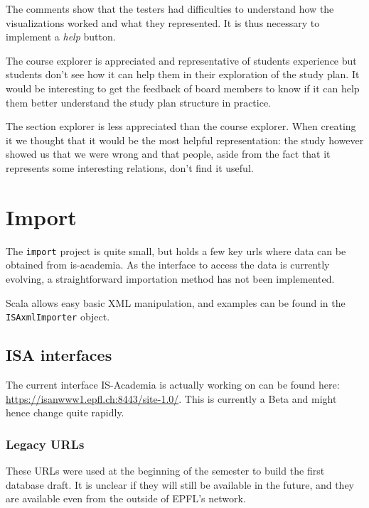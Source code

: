 The comments show that the testers had difficulties to understand how the visualizations worked and what they represented. It is thus necessary to implement a \emph{help} button. 

The course explorer is appreciated and representative of students experience but students don't see how it can help them in their exploration of the study plan. It would be interesting to get the feedback of board members to know if it can help them better understand the study plan structure in practice.

The section explorer is less appreciated than the course explorer. When creating it we thought that it would be the most helpful representation: the study however showed us that we were wrong and that people, aside from the fact that it represents some interesting relations, don't find it useful. 

\chapter{Import}
The \verb|import| project is quite small, but holds a few key urls where data can be obtained from is-academia. As the interface to access the data is currently evolving, a straightforward importation method has not been implemented.

Scala allows easy basic XML manipulation, and examples can be found in the \verb|ISAxmlImporter| object.

\section{ISA interfaces}
The current interface IS-Academia is actually working on can be found here: \url{https://isanwww1.epfl.ch:8443/site-1.0/}. This is currently a Beta and might hence change quite rapidly.

\subsection{Legacy URLs}
These URLs were used at the beginning of the semester to build the first database draft. It is unclear if they will still be available in the future, and they are available even from the outside of EPFL's network.

